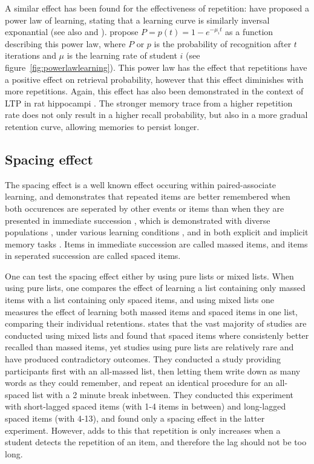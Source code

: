 A similar effect has been found for the effectiveness of repetition:  have proposed a power law of learning, stating that a learning curve is similarly inversal exponantial (see also  and ).  propose $P = p(t) = 1-e^{-\mu_{i}t}$ as a function describing this power law, where $P$ or $p$ is the probability of recognition after $t$ iterations and $\mu$ is the learning rate of student $i$ (see figure~\ref{fig:powerlawlearning}). This power law has the effect that repetitions have a positive effect on retrieval probability, however that this effect diminishes with more repetitions. Again, this effect has also been demonstrated in the context of LTP in rat hippocampi \cite{barnes}. The stronger memory trace from a higher repetition rate does not only result in a higher recall probability, but also in a more gradual retention curve, allowing memories to persist longer.

\subsection{Spacing effect}

The spacing effect is a well known effect occuring within paired-associate learning, and demonstrates that repeated items are better remembered when both occurences are seperated by other events or items than when they are presented in immediate succession \cite{verkoeijen, logan, siegel, xue, karpicke2}, which is demonstrated with diverse populations \cite{verkoeijen, logan}, under various learning conditions \cite{verkoeijen, logan}, and in both explicit and implicit memory tasks \cite{verkoeijen}. Items in immediate succession are called massed items, and items in seperated succession are called spaced items.

One can test the spacing effect either by using pure lists or mixed lists. When using pure lists, one compares the effect of learning a list containing only massed items with a list containing only spaced items, and using mixed lists one measures the effect of learning both massed items and spaced items in one list, comparing their individual retentions.  states that the vast majority of studies are conducted using mixed lists and found that spaced items where consistenly better recalled than massed items, yet studies using pure lists are relatively rare and have produced contradictory outcomes. They conducted a study providing participants first with an all-massed list, then letting them write down as many words as they could remember, and repeat an identical procedure for an all-spaced list with a 2 minute break inbetween. They conducted this experiment with short-lagged spaced items (with 1-4 items in between) and long-lagged spaced items (with 4-13), and found only a spacing effect in the latter experiment. However,  adds to this that repetition is only increases when a student detects the repetition of an item, and therefore the lag should not be too long.

